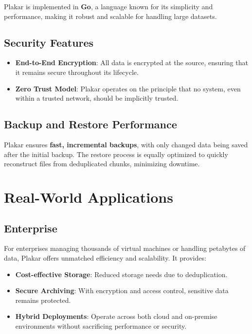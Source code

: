 \documentclass{article}
\begin{document}
Plakar is implemented in \textbf{Go}, a language known for its simplicity and performance, making it robust and scalable for handling large datasets.

\subsection*{Security Features}

\begin{itemize}
    \item \textbf{End-to-End Encryption}: All data is encrypted at the source, ensuring that it remains secure throughout its lifecycle.
    \item \textbf{Zero Trust Model}: Plakar operates on the principle that no system, even within a trusted network, should be implicitly trusted.
\end{itemize}

\subsection*{Backup and Restore Performance}

Plakar ensures \textbf{fast, incremental backups}, with only changed data being saved after the initial backup. The restore process is equally optimized to quickly reconstruct files from deduplicated chunks, minimizing downtime.

\section*{Real-World Applications}

\subsection*{Enterprise}

For enterprises managing thousands of virtual machines or handling petabytes of data, Plakar offers unmatched efficiency and scalability. It provides:
\begin{itemize}
    \item \textbf{Cost-effective Storage}: Reduced storage needs due to deduplication.
    \item \textbf{Secure Archiving}: With encryption and access control, sensitive data remains protected.
    \item \textbf{Hybrid Deployments}: Operate across both cloud and on-premise environments without sacrificing performance or security.
\end{itemize}
\end{document}
